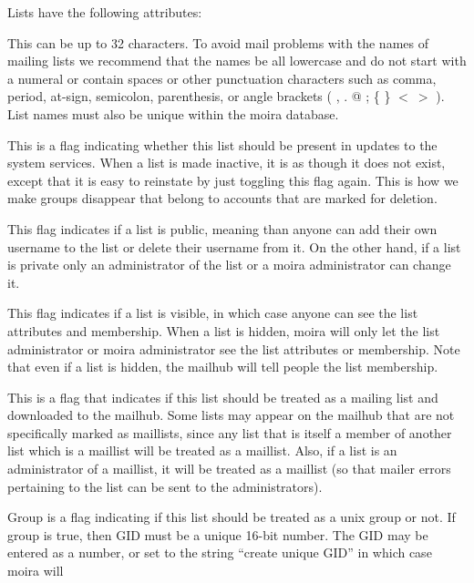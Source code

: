 \documentclass{book}
\begin{document}
Lists have the following attributes:
\begin{description}
\item[name] This can be up to 32 characters.  To avoid mail
problems with the names of mailing lists we recommend that the names
be all lowercase and do not start with a numeral or contain spaces or
other punctuation characters such as comma, period, at-sign, semicolon,
parenthesis, or angle brackets ( , . @ ; \{ \} $<\ >$ ).  List names must
also be unique within the moira database.
\item[active/inactive] This is a flag indicating whether this list should be
present in updates to the system services.  When a list is made
inactive, it is as though it does not exist, except that it is easy to
reinstate by just toggling this flag again.  This is how we make
groups disappear that belong to accounts that are marked for deletion.
\item[public/private] This flag indicates if a list is public, meaning than
anyone can add their own username to the list or delete their username
from it.  On the other hand, if a list is private only an
administrator of the list or a moira administrator can change it.
\item[visible/hidden] This flag indicates if a list is visible, in which
case anyone can see the list attributes and membership.  When a list
is hidden, moira will only let the list administrator or moira
administrator see the list attributes or membership.  Note that even
if a list is hidden, the mailhub will tell people the list membership.
\item[maillist] This is a flag that indicates if this list should be treated
as a mailing list and downloaded to the mailhub.  Some lists may
appear on the mailhub that are not specifically marked as maillists,
since any list that is itself a member of another list which is a
maillist will be treated as a maillist.  Also, if a list is an
administrator of a maillist, it will be treated as a maillist (so that
mailer errors pertaining to the list can be sent to the administrators).
\item[group and GID] Group is a flag indicating if this list should be
treated as a {\sc unix} group or not.  If group is true, then GID must
be a unique 16-bit number.  The GID may be entered as a number, or
set to the string ``create unique GID'' in which case moira will

\end{description}
\end{document}
